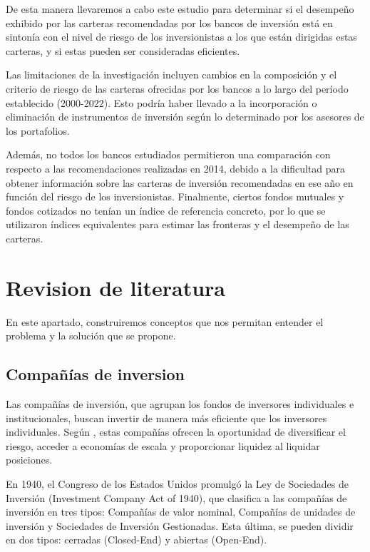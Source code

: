 \documentclass[a4paper,fleqn]{cas-sc}
\begin{document}
De esta manera llevaremos a cabo este estudio para determinar si el desempeño exhibido por las carteras recomendadas por los bancos de inversión está en sintonía con el nivel de riesgo de los inversionistas a los que están dirigidas estas carteras, y si estas pueden ser consideradas eficientes.

Las limitaciones de la investigación incluyen cambios en la composición y el criterio de riesgo de las carteras ofrecidas por los bancos a lo largo del período establecido (2000-2022). Esto podría haber llevado a la incorporación o eliminación de instrumentos de inversión según lo determinado por los asesores de los portafolios. 


Además, no todos los bancos estudiados permitieron una comparación con respecto a las recomendaciones realizadas en 2014, debido a la dificultad para obtener información sobre las carteras de inversión recomendadas en ese año en función del riesgo de los inversionistas. Finalmente, ciertos fondos mutuales y fondos cotizados no tenían un índice de referencia concreto, por lo que se utilizaron índices equivalentes para estimar las fronteras y el desempeño de las carteras.


\section{Revision de literatura}

En este apartado, construiremos conceptos que nos permitan entender el problema y la solución que se propone.

\subsection{Compañías de inversion}

Las compañías de inversión, que agrupan los fondos de inversores individuales e institucionales, buscan invertir de manera más eficiente que los inversores individuales. Según \cite{BECCALLI}, estas compañías ofrecen la oportunidad de diversificar el riesgo, acceder a economías de escala y proporcionar liquidez al liquidar posiciones.

En 1940, el Congreso de los Estados Unidos promulgó la Ley de Sociedades de Inversión (Investment Company Act of 1940), que clasifica a las compañías de inversión en tres tipos: Compañías de valor nominal, Compañías de unidades de inversión y Sociedades de Inversión Gestionadas. Esta última, se pueden dividir en dos tipos: cerradas (Closed-End) y abiertas (Open-End). 
\end{document}
